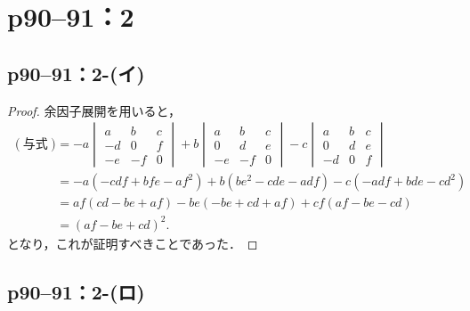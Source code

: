 \documentclass[a4paper,10pt,fleqn]{ltjsarticle}
\begin{document}
\section*{p90--91：2}

\subsection*{p90--91：2-(イ)}

\begin{tleftbar}
    \begin{proof}
        余因子展開を用いると，
        \begin{align*}
            (\text{与式}) & = -a \begin{vmatrix} a & b & c \\ -d & 0 &f \\ -e & -f & 0 \end{vmatrix} +b \begin{vmatrix} a & b & c \\ 0 & d & e \\ -e & -f & 0 \end{vmatrix} -c \begin{vmatrix} a & b & c \\ 0 & d & e \\ -d & 0 & f \end{vmatrix} \\
                        & = -a (-cdf +bfe-af^2)+b(be^2-cde-adf)-c(-adf+bde-cd^2)                                                                                                                                                                \\
                        & = af (cd-be+af) -be(-be+cd+af) +cf(af-be-cd)                                                                                                                                                                          \\
                        & = (af-be+cd)^2.
        \end{align*}
        となり，これが証明すべきことであった．
    \end{proof}
\end{tleftbar}

\subsection*{p90--91：2-(ロ)}
\end{document}
